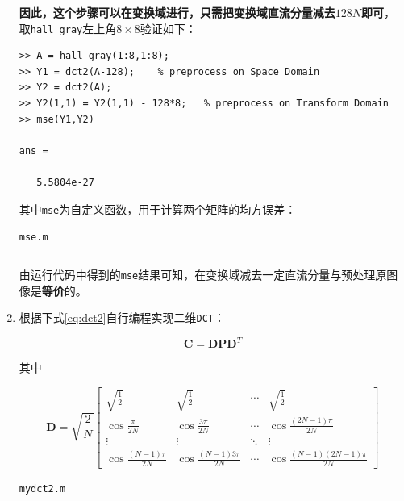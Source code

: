 \documentclass{article}
\numberwithin{figure}{section}
\numberwithin{table}{section}
\numberwithin{listing}{section}
\numberwithin{equation}{section}
\begin{document}
\begin{enumerate}
                \textbf{因此，这个步骤可以在变换域进行，只需把变换域直流分量减去$128N$即可}，取\texttt{hall\_gray}左上角$8\times 8$验证如下：

                \begin{verbatim}
>> A = hall_gray(1:8,1:8);
>> Y1 = dct2(A-128);    % preprocess on Space Domain
>> Y2 = dct2(A);
>> Y2(1,1) = Y2(1,1) - 128*8;   % preprocess on Transform Domain
>> mse(Y1,Y2)

ans =

   5.5804e-27
                \end{verbatim}

                其中\texttt{mse}为自定义函数，用于计算两个矩阵的均方误差：

                \begin{listing}[H]
                    \caption{\texttt{mse.m}}
                    \label{code:mse}
                    \inputminted{matlab}{../mse.m}
                \end{listing}

                由运行代码中得到的\texttt{mse}结果可知，在变换域减去一定直流分量与预处理原图像是\textbf{等价}的。

            \item 根据下式\ref{eq:dct2}自行编程实现二维\texttt{DCT}：

                \begin{equation}
                    \label{eq:dct2}
                    \mathbf{C} = \mathbf{DPD}^T
                \end{equation}

                其中

                \[
                    \mathbf{D} = \sqrt{\frac{2}{N}} \begin{bmatrix}
                        \sqrt{\frac{1}{2}} & \sqrt{\frac{1}{2}} & \cdots & \sqrt{\frac{1}{2}} \\
                        \cos{\frac{\pi}{2N}} & \cos{\frac{3\pi}{2N}} & \cdots & \cos{\frac{(2N-1)\pi}{2N}} \\
                        \vdots & \vdots & \ddots & \vdots \\
                        \cos{\frac{(N-1)\pi}{2N}} & \cos{\frac{(N-1)3\pi}{2N}} & \cdots & \cos{\frac{(N-1)(2N-1)\pi}{2N}}
                    \end{bmatrix}
                \]

                \begin{listing}[H]
                    \caption{\texttt{mydct2.m}}
                    \label{code:mydct2}
                    \inputminted{matlab}{../mydct2.m}
                \end{listing}


\end{enumerate}
\end{document}
